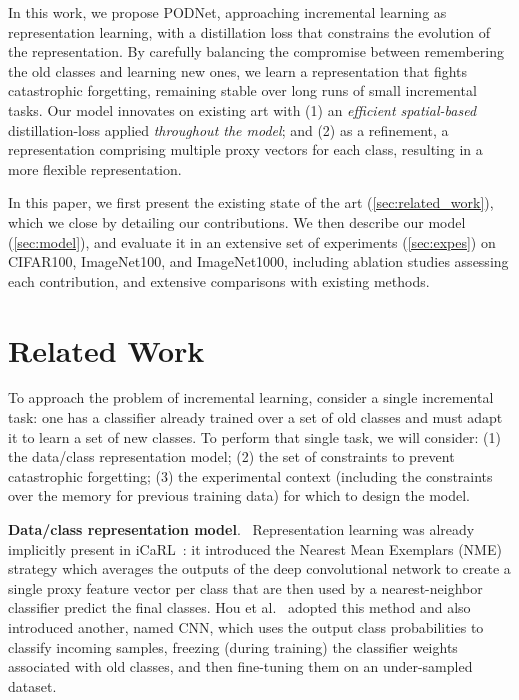 \documentclass[runningheads]{llncs}
\newcommand{\parag}[1]{\vspace{0.2cm}\noindent\textbf{#1}.\ }
\begin{document}
In this work, we propose PODNet, approaching incremental learning as representation learning, with a distillation loss that constrains the evolution of the representation. By carefully balancing the compromise between remembering the old classes and learning new ones, we learn a representation that fights catastrophic forgetting, remaining stable over long runs of small incremental tasks. Our model innovates on existing art with (1) an \textit{efficient spatial-based} distillation-loss applied \textit{throughout the model}; and (2) as a refinement, a representation comprising multiple proxy vectors for each class, resulting in a more flexible representation.

In this paper, we first present the existing state of the art (\autoref{sec:related_work}), which we close by detailing our contributions. We then describe our model (\autoref{sec:model}), and evaluate it in an extensive set of experiments (\autoref{sec:expes}) on CIFAR100, ImageNet100, and ImageNet1000, including ablation studies assessing each contribution, and extensive comparisons with existing methods. 

\section{Related Work}
\label{sec:related_work}

To approach the problem of incremental learning, consider a single incremental task: one has a classifier already trained over a set of old classes and must adapt it to learn a set of new classes.
To perform that single task, we will consider: (1) the data/class representation model; (2) the set of constraints to prevent catastrophic forgetting; (3) the experimental context (including the constraints over the memory for previous training data) for which to design the model.

\parag{Data/class representation model} Representation learning was already implicitly present in iCaRL~\cite{rebuffi2017icarl}: it introduced the Nearest Mean Exemplars (NME) strategy which averages the outputs of the deep convolutional network to create a single proxy feature vector per class that are then used by a nearest-neighbor classifier predict the final classes. Hou et al.~\cite{hou2019ucir} adopted this method and also introduced another, named CNN, which uses the output class probabilities to classify incoming samples, freezing (during training) the classifier weights associated with old classes, and then fine-tuning them on an under-sampled dataset.
\end{document}
